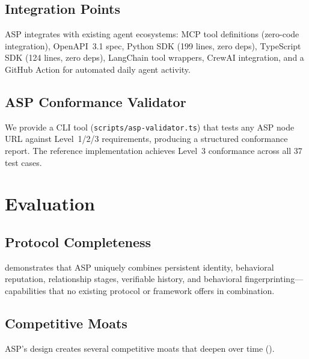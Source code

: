 \documentclass[11pt,a4paper]{article}
\begin{document}
\subsection{Integration Points}

ASP integrates with existing agent ecosystems: MCP tool definitions (zero-code integration), OpenAPI~3.1 spec, Python SDK (199 lines, zero deps), TypeScript SDK (124 lines, zero deps), LangChain tool wrappers, CrewAI integration, and a GitHub Action for automated daily agent activity.

\subsection{ASP Conformance Validator}

We provide a CLI tool (\texttt{scripts/asp-validator.ts}) that tests any ASP node URL against Level~1/2/3 requirements, producing a structured conformance report. The reference implementation achieves Level~3 conformance across all 37 test cases.

\section{Evaluation}\label{sec:eval}

\subsection{Protocol Completeness}

 demonstrates that ASP uniquely combines persistent identity, behavioral reputation, relationship stages, verifiable history, and behavioral fingerprinting---capabilities that no existing protocol or framework offers in combination.

\subsection{Competitive Moats}

ASP's design creates several competitive moats that deepen over time ().
\end{document}
